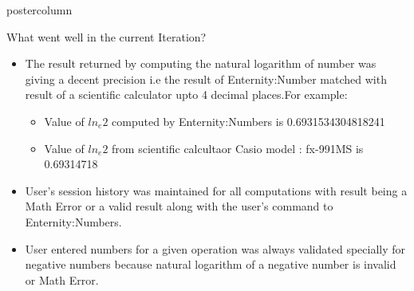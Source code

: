 \documentclass[final,hyperref={pdfpagelabels=false}]{beamer}
\newlength{\columnheight}
\begin{document}
\begin{frame}
\begin{columns}
    \begin{column}{.49\textwidth}
      \begin{beamercolorbox}[center,wd=\textwidth]{postercolumn}
        \begin{minipage}[T]{.95\textwidth}  %
          \parbox[t][\columnheight]{\textwidth}{ %
            \begin{block}{What went well in the current Iteration?}
              \begin{itemize}
              \item The result returned by computing the natural logarithm of number was giving a decent precision i.e the result of Enternity:Number matched with result of a scientific calculator upto 4 decimal places.For example:
                \begin{itemize}
                \item Value of $ln_e{2}$ computed by Enternity:Numbers is 0.6931534304818241
                 \item Value of $ln_e{2}$ from scientific calcultaor  Casio model : fx-991MS is 0.69314718
                \end{itemize}
              \item User's session history was maintained for all computations with result being a Math Error or a valid result along with the user's command to Enternity:Numbers.
              \item User entered numbers for a given operation was always validated specially for negative numbers because natural logarithm of a negative number is invalid or Math Error.
                
              \end{itemize}              
            

\end{block}}
\end{minipage}
\end{beamercolorbox}
\end{column}
\end{columns}
\end{frame}
\end{document}
